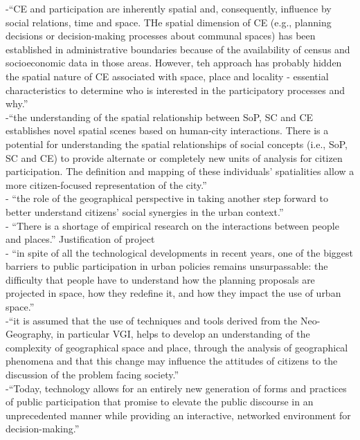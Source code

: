 -{\color{orange}“CE and participation are inherently spatial and, consequently, influence by social relations, time and space. THe spatial dimension of CE (e.g., planning decisions or decision-making processes about communal spaces) has been established in administrative boundaries because of the availability of census and socioeconomic data in those areas. However, teh approach has probably hidden the spatial nature of CE associated with space, place and locality - essential characteristics to determine who is interested in the participatory processes and why.”} \cite{Acedo2019}\\
-{\color{orange}“the understanding of the spatial relationship between SoP, SC and CE establishes novel spatial scenes based on human-city interactions. There is a potential for understanding the spatial relationships of social concepts (i.e., SoP, SC and CE) to provide alternate or completely new units of analysis for citizen participation. The definition and mapping of these individuals’ spatialities allow a more citizen-focused representation of the city.”} \cite{Acedo2019}\\
-{\color{orange} “the role of the geographical perspective in taking another step forward to better understand citizens’ social synergies in the urban context.”} \cite{Acedo2019}\\
-{\color{orange} “There is a shortage of empirical research on the interactions between people and places.” Justification of project} \cite{Acedo2019}\\
-{\color{orange} “in spite of all the technological developments in recent years, one of the biggest barriers to public participation in urban policies remains unsurpassable: the difficulty that people have to understand how the planning proposals are projected in space, how they redefine it, and how they impact the use of urban space.”} \cite{Painho2013}\\
-{\color{orange}“it is assumed that the use of techniques and tools derived from the Neo-Geography, in particular VGI, helps to develop an understanding of the complexity of geographical space and place, through the analysis of geographical phenomena and that this change may influence the attitudes of citizens to the discussion of the problem facing society.”}\cite{Painho2013}\\
-{\color{orange}“Today, technology allows for an entirely new generation of forms and practices of public participation that promise to elevate the public discourse in an unprecedented manner while providing an interactive, networked environment for decision-making.”}\cite{Evans-Cowley2010}\\
